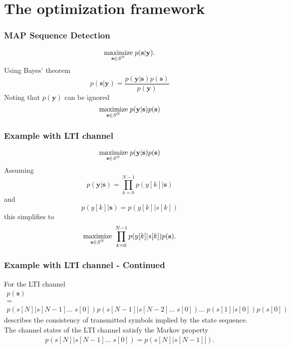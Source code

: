 \documentclass[10pt,tgadventor, onlymath]{beamer}
\begin{document}
\section{The optimization framework}

\begin{frame}
\frametitle{MAP Sequence Detection}
\begin{equation*}
\underset{\mathbf{s}\in\textit{\cal{S}}^N}{\text{maximize}} \; p(\mathbf{s}|\mathbf{y}).
\end{equation*} 
\pause
Using Bayes' theorem
\begin{equation*}
p(\mathbf{s}|\mathbf{y}) = 
\frac
{p(\mathbf{y}|\mathbf{s})p(\mathbf{s})}
{p(\mathbf{y})}
\end{equation*} 
Noting that $p(\mathbf{y})$ can be ignored 
\pause
\begin{equation}\label{opt_problem}
\underset{\mathbf{s}\in\textit{\cal{S}}^N}{\text{maximize}}\; p(\mathbf{y}|\mathbf{s})p(\mathbf{s})
\end{equation}

\end{frame}

\begin{frame}
\frametitle{Example with LTI channel}
\begin{equation*}\label{opt_problem}
\underset{\mathbf{s}\in\textit{\cal{S}}^N}{\text{maximize}}\; p(\mathbf{y}|\mathbf{s})p(\mathbf{s})
\end{equation*}
\pause
Assuming 
\begin{equation*}
p(\mathbf{y}|\mathbf{s}) = \prod_{k=0}^{N-1} p(y[k]|\mathbf{s})
\end{equation*}
\pause
and 
\begin{equation*}
p(y[k]|\mathbf{s}) = p(y[k]|s[k])
\end{equation*}
\pause
this simplifies to 
\begin{equation*}\label{opt_problem}
\underset{\mathbf{s}\in\textit{\cal{S}}^N}{\text{maximize}}\; \prod_{k=0}^{N-1} p(y[k]|s[k])p(\mathbf{s}).
\end{equation*}
\end{frame}

\begin{frame}
\frametitle{Example with LTI channel - Continued}
For the LTI channel
\begin{gather*}
p(\mathbf{s}) \\=\\
 p(s[N]| s[N-1]... \; s[0]) p(s[N-1]| s[N-2]... \; s[0])... \; p(s[1]| s[0])p(s[0])
\end{gather*}
describes the consistency of transmitted symbols implied by the state sequence.
The channel states of the LTI channel satisfy the Markov property 
\begin{gather*}
 p(s[N]| s[N-1]... \; s[0]) =  p(s[N]| s[N-1]]).
\end{gather*}

\end{frame}
\end{document}
